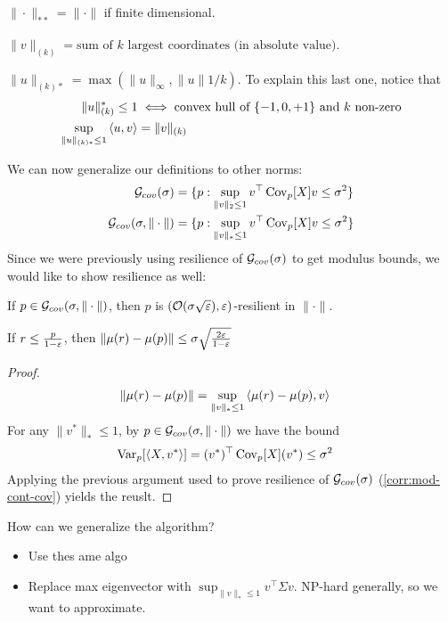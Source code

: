 \begin{theorem}
  $\|\cdot\|_{**} = \|\cdot\|$ if finite dimensional.

  $\|v\|_{(k)} = \text{sum of $k$ largest coordinates (in absolute value)}$.

  $\|u\|_{(k)*} = \max(\|u\|_\infty, \|u\|1 / k)$.
  To explain this last one, notice that
  \begin{align}
    \|u\|_{(k)}^* \leq 1 &\iff \text{convex hull of $\{-1,0,+1\}$ and $k$ non-zero} \\
    \sup_{\|u\|_{(k)*} \leq 1} \braket{u,v} &= \|v\|_{(k)}
  \end{align}
\end{theorem}

We can now generalize our definitions to other norms:
\begin{align}
  \mathcal{G}_{cov}(\sigma) &= \{ p : \sup_{\|v\|_2 \leq 1} v^\top \operatorname{Cov}_p[X] v \leq \sigma^2 \} \\
  \mathcal{G}_{cov}(\sigma, \|\cdot\|) &= \{ p : \sup_{\|v\|_* \leq 1} v^\top \operatorname{Cov}_p[X] v \leq \sigma^2 \} \\
\end{align}
Since we were previously using resilience of $\mathcal{G}_{cov}(\sigma)$ to get
modulus bounds, we would like to show resilience as well:
\begin{proposition}
  If $p \in \mathcal{G}_{cov}(\sigma, \|\cdot\|)$, then
  $p$ is $(\mathcal{O}(\sigma \sqrt{\varepsilon}), \varepsilon)$-resilient in $\|\cdot\|$.

  If $r \leq \frac{p}{1-\varepsilon}$, then
  $\|\mu(r) - \mu(p)\| \leq \sigma \sqrt{\frac{2 \varepsilon}{1-\varepsilon}}$
\end{proposition}

\begin{proof}
  \begin{align}
    \|\mu(r) - \mu(p) \|
    &= \sup_{\|v\|_* \leq 1} \braket{\mu(r) - \mu(p), v}
  \end{align}
  For any $\|v^*\|_* \leq 1$, by $p \in \mathcal{G}_{cov}(\sigma, \|\cdot\|)$
  we have the bound
  \begin{align}
    \operatorname{Var}_p[\braket{X, v^*}] &= (v^*)^\top \operatorname{Cov}_p[X] (v^*) \leq \sigma^2
  \end{align}
  Applying the previous argument used to prove resilience of $\mathcal{G}_{cov}(\sigma)$
  (\cref{corr:mod-cont-cov}) yields the reuslt.
\end{proof}

How can we generalize the algorithm?

\begin{itemize}
  \item Use thes ame algo
  \item Replace max eigenvector with $\sup_{\|v\|_* \leq 1} v^\top \Sigma v$.
    NP-hard generally, so we want to approximate.
\end{itemize}


